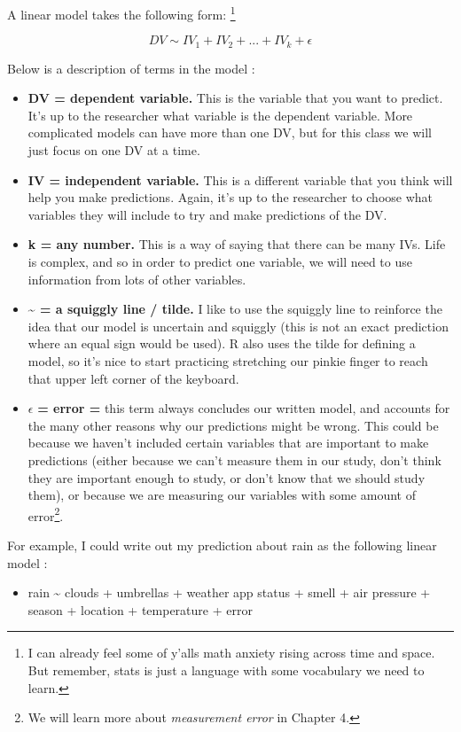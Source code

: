 \documentclass[
  letterpaper,
  DIV=11,
  numbers=noendperiod,
  oneside]{scrreprt}
\providecommand{\tightlist}{%
  \setlength{\itemsep}{0pt}\setlength{\parskip}{0pt}}\usepackage{longtable,booktabs,array}
\begin{document}
A linear model takes the following form: \footnote{I can already feel
  some of y'alls math anxiety rising across time and space. But
  remember, stats is just a language with some vocabulary we need to
  learn.}

\[
DV \sim IV_1 + IV_2 + ... + IV_k + \epsilon
\]

Below is a description of terms in the model :

\begin{itemize}
\item
  \textbf{DV = dependent variable.} This is the variable that you want
  to predict. It's up to the researcher what variable is the dependent
  variable. More complicated models can have more than one DV, but for
  this class we will just focus on one DV at a time.
\item
  \textbf{IV = independent variable.} This is a different variable that
  you think will help you make predictions. Again, it's up to the
  researcher to choose what variables they will include to try and make
  predictions of the DV.
\item
  \textbf{k = any number.} This is a way of saying that there can be
  many IVs. Life is complex, and so in order to predict one variable, we
  will need to use information from lots of other variables.
\item
  \textbf{\textasciitilde{} = a squiggly line / tilde.} I like to use
  the squiggly line to reinforce the idea that our model is uncertain
  and squiggly (this is not an exact prediction where an equal sign
  would be used). R also uses the tilde for defining a model, so it's
  nice to start practicing stretching our pinkie finger to reach that
  upper left corner of the keyboard.
\item
  \(\epsilon\) \textbf{= error =} this term always concludes our written
  model, and accounts for the many other reasons why our predictions
  might be wrong. This could be because we haven't included certain
  variables that are important to make predictions (either because we
  can't measure them in our study, don't think they are important enough
  to study, or don't know that we should study them), or because we are
  measuring our variables with some amount of error\footnote{We will
    learn more about \emph{measurement error} in Chapter 4.}.
\end{itemize}

For example, I could write out my prediction about rain as the following
linear model :

\begin{itemize}
\tightlist
\item
  rain \textasciitilde{} clouds + umbrellas + weather app status + smell
  + air pressure + season + location + temperature + error
\end{itemize}
\end{document}
